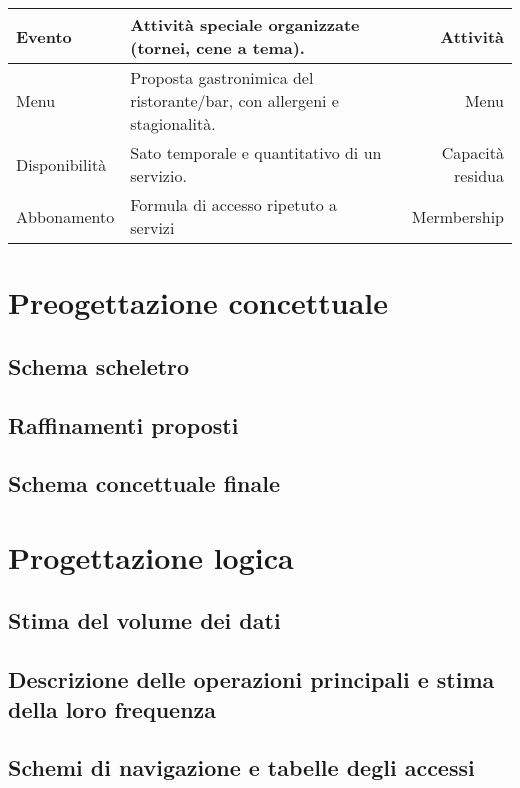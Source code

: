 \documentclass[a4paper,11pt]{report}
\begin{document}
\begin{center}
\begin{tabularx}{\textwidth}{ l X r }
        \hline
        Evento               & Attività speciale organizzate (tornei, cene a tema).                                                & Attività          \\
        \hline
        Menu                 & Proposta gastronimica del ristorante/bar, con allergeni e stagionalità.                             & Menu              \\
        \hline
        Disponibilità        & Sato temporale e quantitativo di un servizio.                                                       & Capacità residua  \\
        \hline
        Abbonamento          & Formula di accesso ripetuto a servizi                                                               & Mermbership       \\
    \end{tabularx}
\end{center}



\chapter{Preogettazione concettuale}
\section{Schema scheletro}
\section{Raffinamenti proposti}

\section{Schema concettuale finale}


\chapter{Progettazione logica}
\section{Stima del volume dei dati}

\section{Descrizione delle operazioni principali e stima della loro frequenza}

\section{Schemi di navigazione e tabelle degli accessi}
\end{document}
